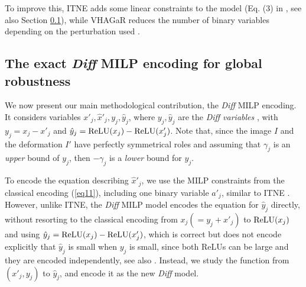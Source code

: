 	To improve this, ITNE adds some linear constraints to the model (Eq. (3) in \cite{ITNE}, see also Section \ref{s.diff}), while VHAGaR reduces the number of binary variables depending on the perturbation used \cite{vhagar}.
	
	


	
	
	


	

\fi
	
\subsection{The exact {\em Diff} MILP encoding for global robustness}
	\label{s.diff}

We now present our main methodological contribution, the {\em Diff} MILP encoding. It considers variables $x'_j,\hat{x}'_j, y_j, \hat{y}_j$, where $y_j, \hat{y}_j$ are the {\em Diff variables} \citep{diff}, with 
	$y_j = x_j - x'_j$ and $\hat{y}_j= \mathrm{ReLU}({x}_j) - \mathrm{ReLU}(x'_j)$. 
	Note that, since the image $I$ and the deformation $I'$ have perfectly symmetrical roles and assuming that $\gamma_j$ is an {\em upper} bound of $y_j$, then $-\gamma_j$ is a {\em lower} bound for $y_j$.


	To encode the equation describing $\hat{x}'_j$, we use 
	the MILP constraints from the classical encoding (\ref{eq11}), including
	one binary variable $a'_j$, similar to ITNE \cite{ITNE}.
    However, unlike ITNE, 
	the {\em Diff} MILP model encodes the equation for $\hat{y}_j$ directly, without resorting to the classical encoding from $x_j(=y_j+x'_j)$ to 
	$\mathrm{ReLU}(x_j)$ and using $\hat{y}_j= \mathrm{ReLU}(x_j) - \mathrm{ReLU}(x'_j)$, which is correct but does not encode explicitly that $\hat{y}_j$ is small when $y_j$ is small, since both ReLUs can be large and they are encoded independently, see also \cite{diff}. Instead, we study the function from $(x'_j,y_j)$ to $\hat{y}_j$, and encode it as the new %
	{\em Diff} model.
    



